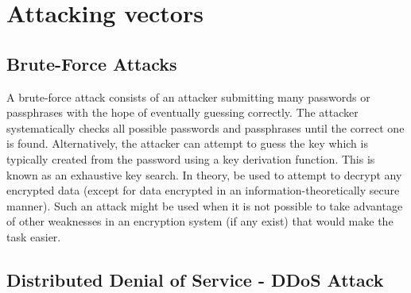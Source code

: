 \documentclass[twocolumn]{article}
\begin{document}
\section{Attacking vectors}





\subsection{Brute-Force Attacks}

 A brute-force attack consists of an attacker submitting many passwords or passphrases with the hope of eventually guessing correctly.
 The attacker systematically checks all possible passwords and passphrases until the correct one is found. Alternatively, the attacker can attempt to guess the key which is typically created from the password using a key derivation function.
 This is known as an exhaustive key search.
 In theory, be used to attempt to decrypt any encrypted data (except for data encrypted in an information-theoretically secure manner). Such an attack might be used when it is not possible to take advantage of other weaknesses in an encryption system (if any exist) that would make the task easier\cite{kanakam2022bruteforce}.
 
 
 
  
  


\subsection{Distributed Denial of Service - DDoS Attack}
\end{document}
